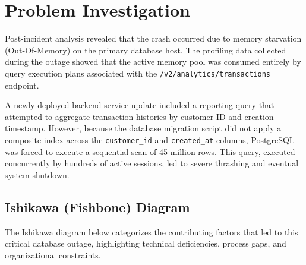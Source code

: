 \section{Problem Investigation}
Post-incident analysis revealed that the crash occurred due to memory starvation (Out-Of-Memory) on the primary database host. The profiling data collected during the outage showed that the active memory pool was consumed entirely by query execution plans associated with the \texttt{/v2/\allowbreak analytics/\allowbreak transactions} endpoint. 

A newly deployed backend service update included a reporting query that attempted to aggregate transaction histories by customer ID and creation timestamp. However, because the database migration script did not apply a composite index across the \texttt{customer\_id} and \texttt{created\_at} columns, PostgreSQL was forced to execute a sequential scan of 45 million rows. This query, executed concurrently by hundreds of active sessions, led to severe thrashing and eventual system shutdown.

\subsection{Ishikawa (Fishbone) Diagram}
The Ishikawa diagram below categorizes the contributing factors that led to this critical database outage, highlighting technical deficiencies, process gaps, and organizational constraints.

